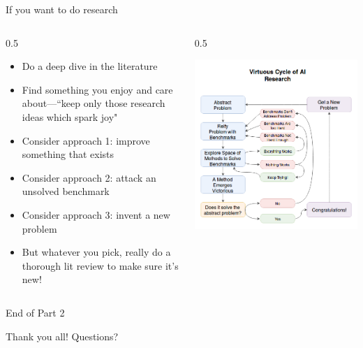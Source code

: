 \documentclass[9pt]{beamer}
\newcommand{\twocolumns}[4]{
\begin{columns}
\begin{column}{#1\textwidth}
    #3
\end{column}
\begin{column}{#2\textwidth}
	#4
\end{column}
\end{columns}
}
\begin{document}
\begin{frame}{If you want to do research}

\twocolumns{0.5}{0.5}{
\begin{itemize}
\item Do a deep dive in the literature
\item Find something you enjoy and care about---``keep only those research ideas which spark joy"
\item Consider approach 1: improve something that exists
\item Consider approach 2: attack an unsolved benchmark
\item Consider approach 3: invent a new problem
\item But whatever you pick, really do a thorough lit review to make sure it's new!
\end{itemize}
}{
\begin{center}
\includegraphics[width=\textwidth]{virtuous_cycle2}
\end{center}
}
\end{frame}

\begin{frame}{End of Part 2}

Thank you all! Questions?
\end{frame}
\end{document}
